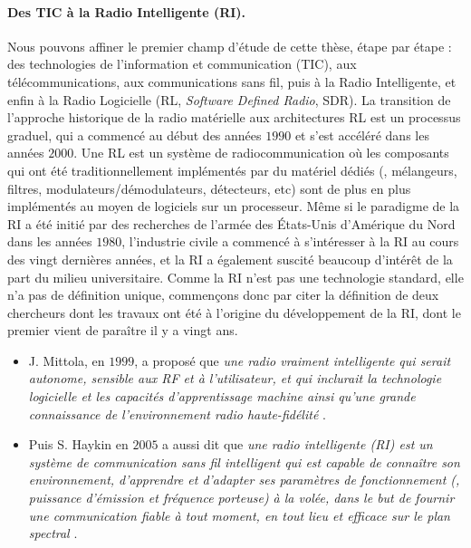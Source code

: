 \begin{resume_fr}
\paragraph{Des TIC à la Radio Intelligente (RI).}
%
Nous pouvons affiner le premier champ d'étude de cette thèse, étape par étape :
des technologies de l'information et communication (TIC), aux télécommunications, aux communications sans fil, puis à la Radio Intelligente,
et enfin à la Radio Logicielle (RL, \emph{Software Defined Radio}, SDR).
%
La transition de l'approche historique de la radio matérielle aux architectures RL est un processus graduel, qui a commencé au début des années $1990$ et s'est accéléré dans les années $2000$.
Une RL est un système de radiocommunication où les composants qui ont été traditionnellement implémentés par du matériel dédiés (\eg, mélangeurs, filtres, modulateurs/démodulateurs, détecteurs, etc) sont de plus en plus implémentés au moyen de logiciels sur un processeur.
%
Même si le paradigme de la RI a été initié par des recherches de l'armée des États-Unis d'Amérique du Nord dans les années $1980$, l'industrie civile a commencé à s'intéresser à la RI au cours des vingt dernières années, et la RI a également suscité beaucoup d'intérêt de la part du milieu universitaire.
%
Comme la RI n'est pas une technologie standard, elle n'a pas de définition unique, commençons donc par citer la définition de deux chercheurs dont les travaux ont été à l'origine du développement de la RI, dont le premier vient de paraître il y a vingt ans.
%
\begin{itemize}\tightlist
    \item
    J. Mittola, en $1999$, a proposé que
    \guillemotleft{} \emph{une radio vraiment intelligente qui serait autonome, sensible aux RF et à l'utilisateur, et qui inclurait la technologie logicielle et les capacités d'apprentissage machine ainsi qu'une grande connaissance de l'environnement radio haute-fidélité} \guillemotright{} \cite{Mitola99}.

    \item
    Puis S. Haykin en $2005$ a aussi dit que
    \guillemotleft{} \emph{une radio intelligente (RI) est un système de communication sans fil intelligent qui est capable de connaître son environnement, d'apprendre et d'adapter ses paramètres de fonctionnement (\eg, puissance d'émission et fréquence porteuse) à la volée, dans le but de fournir une communication fiable à tout moment, en tout lieu et efficace sur le plan spectral} \guillemotright{} \cite{Haykin05}.


\end{itemize}
\end{resume_fr}
